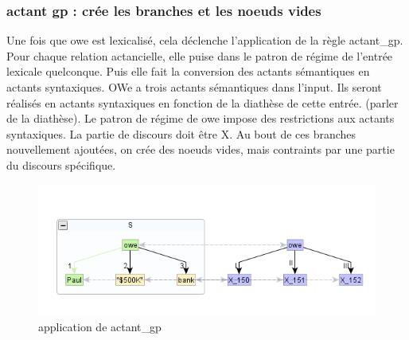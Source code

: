 \subsubsection{actant gp : crée les branches et les noeuds vides}
Une fois que owe est lexicalisé, cela déclenche l'application de la règle actant\_gp. Pour chaque relation actancielle, elle puise dans le patron de régime de l'entrée lexicale quelconque. Puis elle fait la conversion des actants sémantiques en actants syntaxiques. OWe a trois actants sémantiques dans l'input. Ils seront réalisés en actants syntaxiques en fonction de la diathèse de cette entrée. (parler de la diathèse). Le patron de régime de owe impose des restrictions aux actants syntaxiques. La partie de discours doit être X. Au bout de ces branches nouvellement ajoutées, on crée des noeuds vides, mais contraints par une partie du discours spécifique.
\begin{figure}[htb]
	\centering
	\includegraphics[width=1\textwidth, trim = {0cm 0cm 0cm 0cm},clip]{ch3/figs/actant_gp1.png}
	\caption{application de actant\_gp}
	\label{fig:actantgp}
\end{figure}

